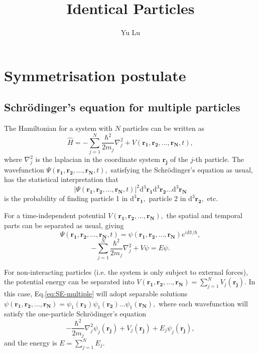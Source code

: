 \documentclass{article}
\title{Identical Particles}
\author{Yu Lu}
\theoremstyle{nonumberplain}
\begin{document}
\maketitle
\section{Symmetrisation postulate}
\subsection{Schrödinger's equation for multiple particles}
The Hamiltonian for a system with $N$ particles can be written as 
\[
    \hat{H} = - \sum\limits_{j=1}^{N} \frac{\hbar ^{2} }{2 m_j} \nabla^{2}_j + V(\mathbf{r_1}, \mathbf{r_2}, \ldots , \mathbf{r_N},  t ),
\]
where $\nabla^{2}_j$ is the laplacian in the coordinate system $\mathbf{r_j}$ of the $j$-th particle. The wavefunction $\Psi (\mathbf{r_1}, \mathbf{r_2}, \ldots , \mathbf{r_N}, t),$ satisfying the Schrödinger's equation as usual, has the statistical interpretation that 
\[
    \left\vert \Psi (\mathbf{r_1}, \mathbf{r_2}, \ldots , \mathbf{r_N}, t) \right\vert ^{2} \mathrm{d} ^3 \mathbf{r_1} \mathrm{d} ^3 \mathbf{r_2} \ldots \mathrm{d} ^3 \mathbf{r_N}  
\]
is the probability of finding particle 1 in $\mathrm{d} ^3 \mathbf{r_1} ,$ particle 2 in $ \mathrm{d} ^3 \mathbf{r_2},$ etc. 

For a time-independent potential $V(\mathbf{r_1}, \mathbf{r_2}, \ldots , \mathbf{r_N} ),$ the spatial and temporal parts can be separated as usual, giving 
\[
    \Psi (\mathbf{r_1}, \mathbf{r_2}, \ldots , \mathbf{r_N} , t)
    = \psi (\mathbf{r_1}, \mathbf{r_2}, \ldots , \mathbf{r_N}) e^{i E t/\hbar },
\] 
\begin{equation}
    \label{eq:SE-multiple}
    -\sum\limits_{j=1}^{N} \frac{\hbar ^{2} }{2 m_j} \nabla ^{2} _j + V \psi = E \psi.
\end{equation} 

For non-interacting particles (i.e. the system is only subject to external forces), the potential energy can be separated into $V(\mathbf{r_1}, \mathbf{r_2}, \ldots , \mathbf{r_N} ) = \sum_{j=1}^{N} V_j(\mathbf{r_j} ). $ In this case, Eq.\eqref{eq:SE-multiple} will adopt separable solutions $\psi(\mathbf{r_1}, \mathbf{r_2}, \ldots , \mathbf{r_N}) = \psi_1(\mathbf{r_1}) \psi_1(\mathbf{r_2}) \ldots \psi_1(\mathbf{r_N}),$ where each wavefunction will satisfy the one-particle Schrödinger's equation 
\[
    -\frac{\hbar ^{2} }{2 m_j} \nabla ^{2} _j \psi_j (\mathbf{r_j}) + V_j(\mathbf{r_j} ) + E_j \psi_j(\mathbf{r_j} ),
\]
and the energy is $E = \sum_{j=1}^{N} E_j.$ 
\end{document}
